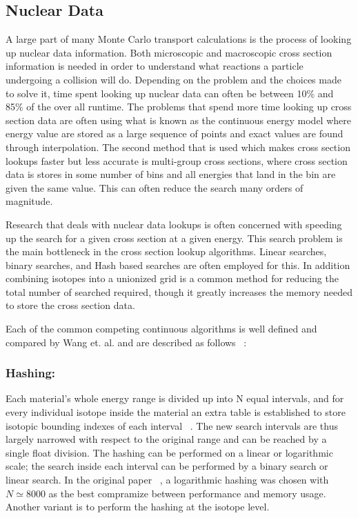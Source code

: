 \subsection{Nuclear Data}

A large part of many Monte Carlo transport calculations is the process of looking up nuclear data information.
%
Both microscopic and macroscopic cross section information is needed in order to understand what reactions a particle undergoing a collision will do.
%
Depending on the problem and the choices made to solve it, time spent looking up nuclear data can often be between 10\% and 85\% of the over all runtime.
%
The problems that spend more time looking up cross section data are often using what is known as the continuous energy model where energy value are stored as a large sequence of points and exact values are found through interpolation.
%
The second method that is used which makes cross section lookups faster but less accurate is multi-group cross sections, where cross section data is stores in some number of bins and all energies that land in the bin are given the same value.
%
This can often reduce the search many orders of magnitude.
%

%
Research that deals with nuclear data lookups is often concerned with speeding up the search for a given cross section at a given energy.
%
This search problem is the main bottleneck in the cross section lookup algorithms.
%
Linear searches, binary searches, and Hash based searches are often employed for this.
%
In addition combining isotopes into a unionized grid is a common method for reducing the total number of searched required, though it greatly increases the memory needed to store the cross section data.
%

Each of the common competing continuous algorithms is well defined and compared by Wang et. al. and are described as follows ~\cite{wang2016competing}:
%
\subsubsection*{ Hashing: } Each material's whole energy range is divided up into N equal intervals, and for every individual isotope inside the material an extra table is established to store isotopic bounding indexes of each interval ~\cite{brown2014new}. The new search intervals are thus largely narrowed with respect to the original range and can be reached by a single float division. The hashing can be performed on a linear or logarithmic scale; the search inside each interval can be performed by a binary search or linear search. In the original paper ~\cite{brown2014new}, a logarithmic hashing was chosen with $ N \simeq 8000 $ as the best compramize between performance and memory usage. Another variant is to perform the hashing at the isotope level.
%
